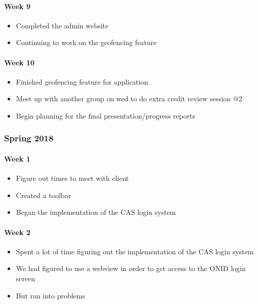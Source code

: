 \documentclass[onecolumn, draftclsnofoot,10pt, compsoc]{IEEEtran}
\begin{document}
      \paragraph{Week 9}
        \begin{itemize}
          \item Completed the admin website
          \item Continuing to work on the geofencing feature
        \end{itemize}

      \paragraph{Week 10}
        \begin{itemize}
          \item Finished geofencing feature for application
          \item Meet up with another group on wed to do extra credit review session @2
          \item Begin planning for the final presentation/progress reports
        \end{itemize}

    \subsubsection{Spring 2018}
      \paragraph{Week 1}
        \begin{itemize}
          \item Figure out times to meet with client
          \item Created a toolbar
          \item Began the implementation of the CAS login system
        \end{itemize}

      \paragraph{Week 2}
        \begin{itemize}
          \item Spent a lot of time figuring out the implementation of the CAS login system
          \item We had figured to use a webview in order to get access to the ONID login screen
          \item But ran into problems
        \end{itemize}
\end{document}
